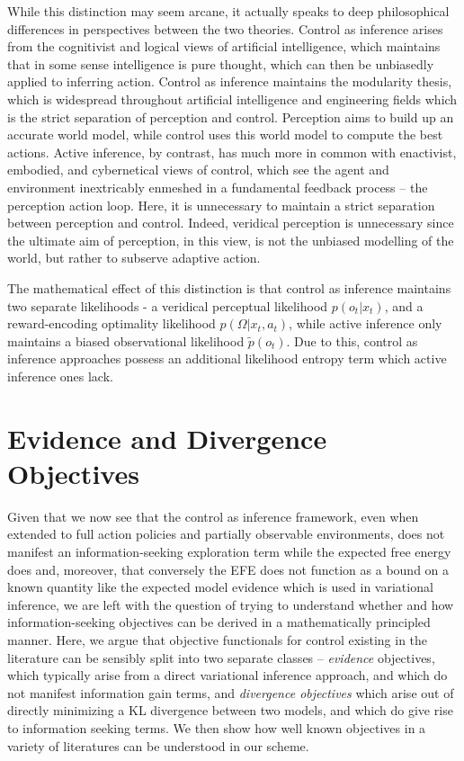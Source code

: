While this distinction may seem arcane, it actually speaks to deep philosophical differences in perspectives between the two theories. Control as inference arises from the cognitivist and logical views of artificial intelligence, which maintains that in some sense intelligence is pure thought, which can then be unbiasedly applied to inferring action. Control as inference maintains the modularity thesis, which is widespread throughout artificial intelligence and engineering fields which is the strict separation of perception and control. Perception aims to build up an accurate world model, while control uses this world model to compute the best actions. Active inference, by contrast, has much more in common with enactivist, embodied, and cybernetical views of control, which see the agent and environment inextricably enmeshed in a fundamental feedback process -- the perception action loop. Here, it is unnecessary to maintain a strict separation between perception and control. Indeed, veridical perception is unnecessary since the ultimate aim of perception, in this view, is not the unbiased modelling of the world, but rather to subserve adaptive action. 

The mathematical effect of this distinction is that control as inference maintains two separate likelihoods - a veridical perceptual likelihood $p(o_t | x_t)$, and a reward-encoding optimality likelihood $p(\Omega | x_t, a_t)$, while active inference only maintains a biased observational likelihood $\tilde{p}(o_t)$. Due to this, control as inference approaches possess an additional likelihood entropy term which active inference ones lack. 

\section{Evidence and Divergence Objectives}

Given that we now see that the control as inference framework, even when extended to full action policies and partially observable environments, does not manifest an information-seeking exploration term while the expected free energy does and, moreover, that conversely the EFE does not function as a bound on a known quantity like the expected model evidence which is used in variational inference, we are left with the question of trying to understand whether and how information-seeking objectives can be derived in a mathematically principled manner. Here, we argue that objective functionals for control existing in the literature can be sensibly split into two separate classes -- \emph{evidence} objectives, which typically arise from a direct variational inference approach, and which do not manifest information gain terms, and \emph{divergence objectives} which arise out of directly minimizing a KL divergence between two models, and which do give rise to information seeking terms. We then show how well known objectives in a variety of literatures can be understood in our scheme. 

